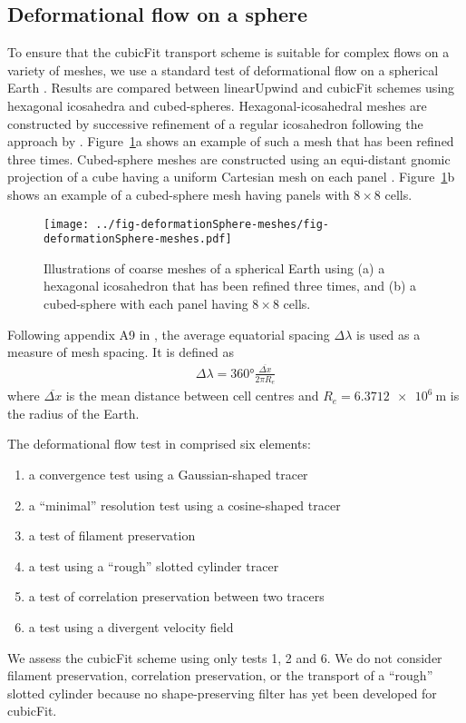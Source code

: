 \subsection{Deformational flow on a sphere}
\label{sec:deformationSphere}

To ensure that the cubicFit transport scheme is suitable for complex flows on a variety of meshes, we use a standard test of deformational flow on a spherical Earth \citep{lauritzen2012}.  
Results are compared between linearUpwind and cubicFit schemes using hexagonal icosahedra and cubed-spheres.
Hexagonal-icosahedral meshes are constructed by successive refinement of a regular icosahedron following the approach by \citep{thuburn2014}.
Figure~\ref{fig:sphere-meshes}a shows an example of such a mesh that has been refined three times.
Cubed-sphere meshes are constructed using an equi-distant gnomic projection of a cube having a uniform Cartesian mesh on each panel \citep{staniforth-thuburn2012}.
Figure~\ref{fig:sphere-meshes}b shows an example of a cubed-sphere mesh having panels with $8 \times 8$ cells.

\begin{figure}
	\centering
	\texttt{[image: ../fig-deformationSphere-meshes/fig-deformationSphere-meshes.pdf]}
	\caption{Illustrations of coarse meshes of a spherical Earth using (a) a hexagonal icosahedron that has been refined three times, and (b) a cubed-sphere with each panel having $8 \times 8$ cells.}
	\label{fig:sphere-meshes}
\end{figure}

Following appendix A9 in \citep{lauritzen2014}, the average equatorial spacing $\Delta \lambda$ is used as a measure of mesh spacing.  It is defined as
\begin{align}
	\Delta \lambda = \ang{360} \frac{\overline{\Delta x}}{2 \pi R_e}
\end{align}
where $\overline{\Delta x}$ is the mean distance between cell centres and $R_e = \SI{6.3712e6}{\meter}$ is the radius of the Earth.

The deformational flow test in \citep{lauritzen2012} comprised six elements:
\begin{enumerate}
\item a convergence test using a Gaussian-shaped tracer
\item a ``minimal'' resolution test using a cosine-shaped tracer
\item a test of filament preservation
\item a test using a ``rough'' slotted cylinder tracer
\item a test of correlation preservation between two tracers
\item a test using a divergent velocity field
\end{enumerate}
We assess the cubicFit scheme using only tests 1, 2 and 6.  We do not consider filament preservation, correlation preservation, or the transport of a ``rough'' slotted cylinder because no shape-preserving filter has yet been developed for cubicFit.

